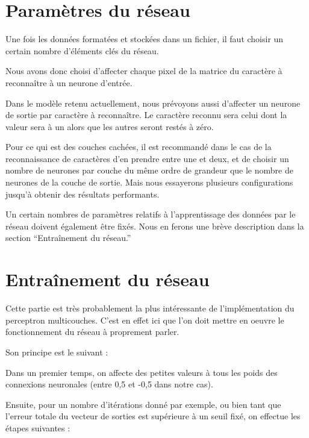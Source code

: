 \documentclass[a4paper,12pt]{report}
\begin{document}

\section{Param\`etres du r\'eseau} %
\label{subsec:choix_des_parametres_du_reseau}

Une fois les donn\'ees format\'ees et stock\'ees dans un fichier, il
faut choisir un certain nombre d'éléments clés du réseau.

Nous avons donc choisi d'affecter chaque pixel de la matrice du
caract\`ere \`a reconna\^itre \`a un neurone d'entr\'ee.

Dans le mod\`ele retenu actuellement, nous pr\'evoyons aussi d'affecter
un neurone de sortie par caract\`ere \`a reconna\^itre. Le caract\`ere
reconnu sera celui dont la valeur sera \`a un alors que les autres seront
rest\'es \`a z\'ero.

Pour ce qui est des couches cach\'ees, il est recommand\'e dans le cas
de la reconnaissance de caract\`eres d'en prendre entre une et deux, et
de choisir un nombre de neurones par couche du m\^eme ordre de grandeur
que le nombre de neurones de la couche de sortie. Mais nous essayerons
plusieurs configurations jusqu'\`a obtenir des r\'esultats
performants.

Un certain nombres de param\`etres relatifs \`a l'apprentissage des
donn\'ees par le r\'eseau doivent \'egalement \^etre fix\'es. Nous en
ferons une br\`eve description dans la section ``Entra\^inement du r\'eseau.''


\section{Entra\^inement du r\'eseau} %
\label{subsec:entrainement_du_reseau}

Cette partie est tr\`es probablement la plus int\'eressante de
l'impl\'ementation du perceptron multicouches. C'est en effet ici que
l'on doit mettre en oeuvre le fonctionnement du r\'eseau \`a proprement
parler. 

Son principe est le suivant :

Dans un premier temps, on affecte des petites valeurs \`a tous les poids
des connexions neuronales (entre 0,5 et -0,5 dans notre cas).

Ensuite, pour un nombre d'it\'erations donn\'e par exemple, ou bien tant
que l'erreur totale du vecteur de sorties est supérieure à un seuil fixé, on effectue
les \'etapes suivantes :
\end{document}

